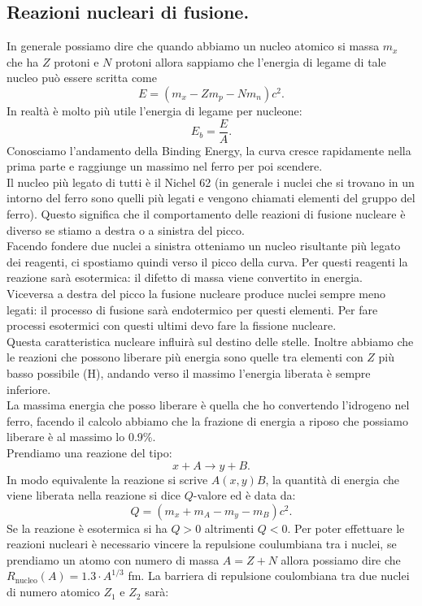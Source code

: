 \subsection{Reazioni nucleari di fusione.}%
\label{sub:Reazioni nucleari di fusione.}
In generale possiamo dire che quando abbiamo un nucleo atomico si massa $m_x$ che ha $Z$ protoni e $N$ protoni allora sappiamo che l'energia di legame di tale nucleo può essere scritta come 
\[
    E=(m_x - Zm_p - Nm_n)c^2
.\] 
In realtà è molto più utile l'energia di legame per nucleone:
\[
E_b = \frac{E}{A}
.\] 
Conosciamo l'andamento della Binding Energy, la curva cresce rapidamente nella prima parte e raggiunge un massimo nel ferro per poi scendere.\\
Il nucleo più legato di tutti è il Nichel 62 (in generale i nuclei che si trovano in un intorno del ferro sono quelli più legati e vengono chiamati elementi del gruppo del ferro). Questo significa che il comportamento delle reazioni di fusione nucleare è diverso se stiamo a destra o a sinistra del picco.\\
Facendo fondere due nuclei a sinistra otteniamo un nucleo risultante più legato dei reagenti, ci spostiamo quindi verso il picco della curva. Per questi reagenti la reazione sarà esotermica: il difetto di massa viene convertito in energia.\\
Viceversa a destra del picco la fusione nucleare produce nuclei sempre meno legati: il processo di fusione sarà endotermico per questi elementi. Per fare processi esotermici con questi ultimi devo fare la fissione nucleare.\\
Questa caratteristica nucleare influirà sul destino delle stelle. Inoltre abbiamo che le reazioni che possono liberare più energia sono quelle tra elementi con $Z$ più basso possibile (H), andando verso il massimo l'energia liberata è sempre inferiore.\\
La massima energia che posso liberare è quella che ho convertendo l'idrogeno nel ferro, facendo il calcolo abbiamo che la frazione di energia a riposo che possiamo liberare è al massimo lo 0.9\%.\\
Prendiamo una reazione del tipo:
\[
x+A\to y+B
.\]   
In modo equivalente la reazione si scrive $A(x,y)B$, la quantità di energia che viene liberata nella reazione si dice $Q$-valore ed è data da:
\[
    Q = \left(m_x+m_A-m_y-m_B\right)c^2
.\]
Se la reazione è esotermica si ha $Q>0$ altrimenti $Q<0$. Per poter effettuare le reazioni nucleari è necessario vincere la repulsione coulumbiana tra i nuclei, se prendiamo un atomo con numero di massa $A=Z+N$ allora possiamo dire che $R_\text{nucleo}(A)=1.3\cdot A^{1 /3}$ fm. La barriera di repulsione coulombiana tra due nuclei di numero atomico $Z_1$ e $Z_2$ sarà:
